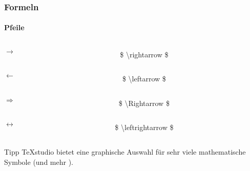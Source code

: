 \begin{frame}
\frametitle{Formeln}
\framesubtitle{Pfeile}

\bigskip


\begin{columns}
\begin{column}{.3\textwidth}
\centering
$ \rightarrow $
\end{column}
\begin{column}{.7\textwidth}
{\ttfamily \color{unibayellowI} \$ \color{nounibaredI}\textbackslash rightarrow \color{unibayellowI} \$ }
\end{column}
\end{columns}

\bigskip

\begin{columns}
\begin{column}{.3\textwidth}
\centering
$ \leftarrow $
\end{column}
\begin{column}{.7\textwidth}
{\ttfamily \color{unibayellowI} \$ \color{nounibaredI}\textbackslash leftarrow \color{unibayellowI} \$ }
\end{column}
\end{columns}

\bigskip

\begin{columns}
\begin{column}{.3\textwidth}
\centering
$ \Rightarrow $
\end{column}
\begin{column}{.7\textwidth}
{\ttfamily \color{unibayellowI} \$ \color{nounibaredI}\textbackslash Rightarrow \color{unibayellowI} \$ }
\end{column}
\end{columns}

\bigskip

\begin{columns}
\begin{column}{.3\textwidth}
\centering
$ \leftrightarrow $
\end{column}
\begin{column}{.7\textwidth}
{\ttfamily \color{unibayellowI} \$ \color{nounibaredI}\textbackslash leftrightarrow \color{unibayellowI} \$ }
\end{column}
\end{columns}

\bigskip

\begin{exampleblock}{Tipp}
TeXstudio bietet eine graphische Auswahl für sehr viele mathematische Symbole (und mehr \smiley).
\end{exampleblock}

\end{frame}

